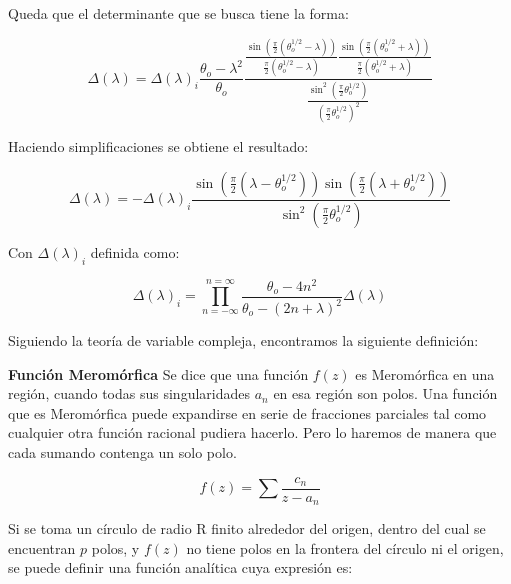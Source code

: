  Queda que el determinante que se busca tiene la forma:

 \begin{equation}\label{eq:E.23}
 \Delta(\lambda)= \Delta(\lambda)_{i}\frac{ \theta_o-\lambda^2}{\theta_o}\frac{\frac{\sin(\frac{\pi}{2}(\theta_o^{1/2}-\lambda))}{\frac{\pi}{2}( \theta_o^{1/2}-\lambda)}\frac{\sin(\frac{\pi}{2}( \theta_o^{1/2}+\lambda))}{\frac{\pi}{2}( \theta_o^{1/2}+\lambda)}}{\frac{\sin^2(\frac{\pi}{2}\theta_o^{1/2})}{(\frac{\pi}{2}\theta_o^{1/2})^2}}
 \end{equation}

 
Haciendo simplificaciones se obtiene el resultado:
 

 \begin{equation}\label{eq:2.20}
 \Delta(\lambda)= -\Delta(\lambda)_{i}\frac{\sin(\frac{\pi}{2}(\lambda-\theta_o^{1/2}))\sin(\frac{\pi}{2}( \lambda+\theta_o^{1/2}))}{\sin^2(\frac{\pi}{2}\theta_o^{1/2})}
\end{equation}
\normalsize

Con $\Delta(\lambda)_i$ definida como: 

\begin{equation}\label{eq:2.21}
\Delta(\lambda)_{i} = \prod_{n=-\infty}^{n=\infty} \frac{\theta_o-4n^2}{\theta_o-(2n+\lambda)^2} \Delta(\lambda)
\end{equation}

Siguiendo la teoría de variable compleja, encontramos la siguiente definición:

\begin{defi}{\textbf{Función Meromórfica}}\label{def:1}
Se dice que una función $f(z)$ es Meromórfica en una región, cuando todas sus singularidades $a_n$ en esa región son polos.
Una función que es Meromórfica puede expandirse en serie de fracciones parciales tal como cualquier otra función racional pudiera hacerlo. Pero lo haremos de manera que cada sumando contenga un solo polo\cite{Philip}.

\begin{equation}\label{eq:2.22}
    f(z)=\sum \frac{c_n}{z-a_n}
\end{equation}
\end{defi}

Si se toma un círculo de radio R finito alrededor del origen, dentro del cual se encuentran $p$ polos, y $f(z)$ no tiene polos en la frontera del círculo ni el origen, se puede definir una función analítica cuya expresión es:

